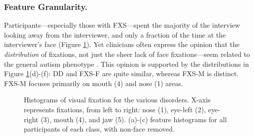 \documentclass{llncs}
\begin{document}
\subsubsection{Feature Granularity.}
Participants---especially those with FXS---spent the majority of the interview looking away from the interviewer, and only a fraction of the time at the interviewer's face (Figure \ref{fig:histo}). Yet clinicians often express the opinion that the \emph{distribution} of fixations, not just the sheer lack of face fixations---seem related to the general autism phenotype \cite{klin2002,jones2013}. This opinion is supported by the distributions in Figure \ref{fig:histo}(d)-(f): DD and FXS-F are quite similar, whereas FXS-M is distinct. FXS-M focuses primarily on mouth (4) and nose (1) areas. 
\begin{figure} [t]
           \hfill
           \hfill
\caption{Histograms of visual fixation for the various disorders. X-axis represents fixations, from left to right: nose (1), eye-left (2), eye-right (3), mouth (4), and jaw (5). (a)-(c) feature histograms for all participants of each class, with non-face removed.}
\label{fig:histo}
\end{figure}
\end{document}
